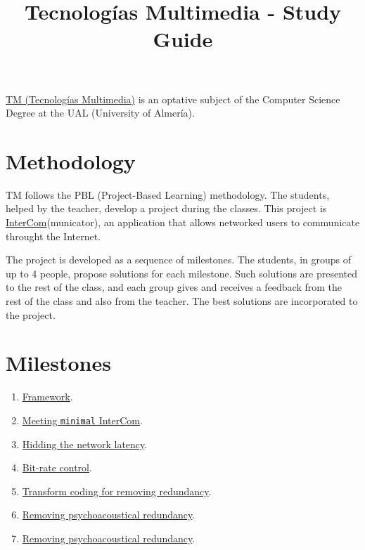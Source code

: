 
\title{Tecnologías Multimedia - Study Guide}

\maketitle

\href{https://www.ual.es/estudios/grados/presentacion/plandeestudios/asignatura/4015/40154321}{TM
  (Tecnologías Multimedia)} is an optative subject of the Computer
Science Degree at the UAL (University of Almería).

\section{Methodology}
TM follows the PBL (Project-Based Learning) methodology. The students,
helped by the teacher, develop a project during the classes. This
project
is \href{https://github.com/Tecnologias-multimedia/intercom}{InterCom}(municator),
an application that allows networked users to communicate throught
the Internet.

The project is developed as a sequence of milestones. The students, in
groups of up to 4 people, propose solutions for each milestone. Such
solutions are presented to the rest of the class, and each group gives
and receives a feedback from the rest of the class and also from the
teacher. The best solutions are incorporated to the project.

\section{Milestones}

\begin{enumerate}
\item \href{https://tecnologias-multimedia.github.io/study_guide/framework/}{Framework}.
\item \href{https://tecnologias-multimedia.github.io/study_guide/minimal/}{Meeting \texttt{minimal} InterCom}.
\item \href{https://tecnologias-multimedia.github.io/study_guide/latency/}{Hidding the network latency}.
\item \href{https://tecnologias-multimedia.github.io/study_guide/BR_control/}{Bit-rate control}.
\item \href{https://tecnologias-multimedia.github.io/study_guide/transform_coding/}{Transform coding for removing redundancy}.
\item \href{https://tecnologias-multimedia.github.io/study_guide/perceptual_coding/}{Removing psychoacoustical redundancy}.
\item \href{https://tecnologias-multimedia.github.io/study_guide/psychoacoustics/}{Removing psychoacoustical redundancy}.
\end{enumerate}

